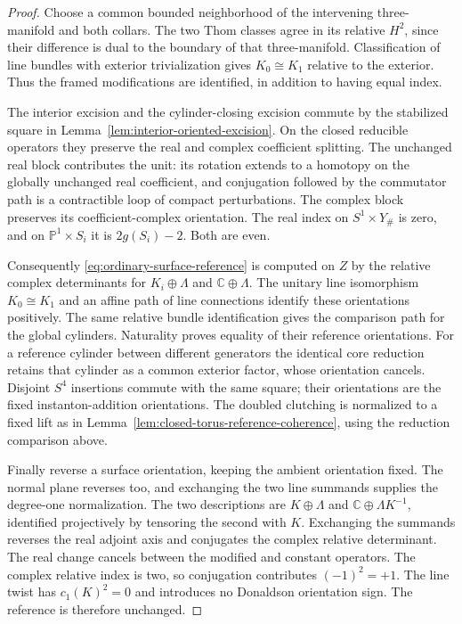 \documentclass[11pt]{amsart}
\theoremstyle{definition}
\theoremstyle{remark}
\theoremstyle{plain}
\newcommand{\PP}{\mathbb{P}}
\begin{document}
\begin{proof}
Choose a common bounded neighborhood of the intervening
three-manifold and both collars. The two Thom classes
agree in its relative $H^2$, since their difference
is dual to the boundary of that three-manifold.
Classification of line bundles with exterior
trivialization gives $K_0\cong K_1$ relative to the
exterior. Thus the framed modifications are
identified, in addition to having equal index.

The interior excision and the cylinder-closing
excision commute by the stabilized square in
Lemma~\ref{lem:interior-oriented-excision}.
On the closed reducible operators they preserve
the real and complex coefficient splitting.
The unchanged real block contributes the unit:
its rotation extends to a homotopy on the globally
unchanged real coefficient, and conjugation
followed by the commutator path is a contractible
loop of compact perturbations. The complex block
preserves its coefficient-complex orientation.
The real index on $S^1\times Y_\#$ is zero,
and on $\PP^1\times S_i$ it is $2g(S_i)-2$.
Both are even.

Consequently \eqref{eq:ordinary-surface-reference}
is computed on $Z$ by the relative complex
determinants for $K_i\oplus\Lambda$ and
$\mathbb C\oplus\Lambda$. The unitary line
isomorphism $K_0\cong K_1$ and an affine
path of line connections identify these
orientations positively. The same relative
bundle identification gives the comparison
path for the global cylinders. Naturality
proves equality of their reference orientations.
For a reference cylinder between different
generators the identical core reduction
retains that cylinder as a common exterior
factor, whose orientation cancels. Disjoint
$S^4$ insertions commute with the same square;
their orientations are the fixed instanton-addition
orientations. The doubled clutching is normalized
to a fixed lift as in
Lemma~\ref{lem:closed-torus-reference-coherence},
using the reduction comparison above.

Finally reverse a surface orientation, keeping
the ambient orientation fixed. The normal
plane reverses too, and exchanging the two
line summands supplies the degree-one
normalization. The two descriptions are
$K\oplus\Lambda$ and
$\mathbb C\oplus\Lambda K^{-1}$, identified
projectively by tensoring the second with $K$.
Exchanging the summands reverses the real
adjoint axis and conjugates the complex
relative determinant. The real change
cancels between the modified and constant
operators. The complex relative index is
two, so conjugation contributes $(-1)^2=+1$.
The line twist has $c_1(K)^2=0$ and
introduces no Donaldson orientation sign.
The reference is therefore unchanged.
\end{proof}
\end{document}
